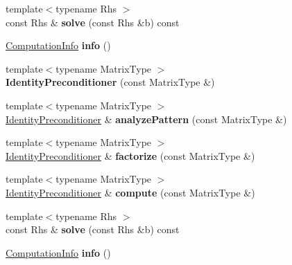 \begin{DoxyCompactItemize}
\item 
\mbox{\label{group___iterative_linear_solvers___module_ade0afcd74021b444a488327d6dd0a07f}} 
{\footnotesize template$<$typename Rhs $>$ }\\const Rhs \& {\bfseries solve} (const Rhs \&b) const
\item 
\mbox{\label{group___iterative_linear_solvers___module_a450681df926cb312fc71a324e150340c}} 
\hyperlink{group__enums_ga85fad7b87587764e5cf6b513a9e0ee5e}{Computation\+Info} {\bfseries info} ()
\item 
\mbox{\label{group___iterative_linear_solvers___module_a5fb381c622f38f3b8deb0775867cdf5f}} 
{\footnotesize template$<$typename Matrix\+Type $>$ }\\{\bfseries Identity\+Preconditioner} (const Matrix\+Type \&)
\item 
\mbox{\label{group___iterative_linear_solvers___module_a87036e0a457777e2c3df4c103b4f8233}} 
{\footnotesize template$<$typename Matrix\+Type $>$ }\\\hyperlink{group___iterative_linear_solvers___module_class_eigen_1_1_identity_preconditioner}{Identity\+Preconditioner} \& {\bfseries analyze\+Pattern} (const Matrix\+Type \&)
\item 
\mbox{\label{group___iterative_linear_solvers___module_a0d0c662f8811acabd6b69cfda901965f}} 
{\footnotesize template$<$typename Matrix\+Type $>$ }\\\hyperlink{group___iterative_linear_solvers___module_class_eigen_1_1_identity_preconditioner}{Identity\+Preconditioner} \& {\bfseries factorize} (const Matrix\+Type \&)
\item 
\mbox{\label{group___iterative_linear_solvers___module_af3c2afdd74084ffa2ae9174df0316695}} 
{\footnotesize template$<$typename Matrix\+Type $>$ }\\\hyperlink{group___iterative_linear_solvers___module_class_eigen_1_1_identity_preconditioner}{Identity\+Preconditioner} \& {\bfseries compute} (const Matrix\+Type \&)
\item 
\mbox{\label{group___iterative_linear_solvers___module_ade0afcd74021b444a488327d6dd0a07f}} 
{\footnotesize template$<$typename Rhs $>$ }\\const Rhs \& {\bfseries solve} (const Rhs \&b) const
\item 
\mbox{\label{group___iterative_linear_solvers___module_a450681df926cb312fc71a324e150340c}} 
\hyperlink{group__enums_ga85fad7b87587764e5cf6b513a9e0ee5e}{Computation\+Info} {\bfseries info} ()
\end{DoxyCompactItemize}
